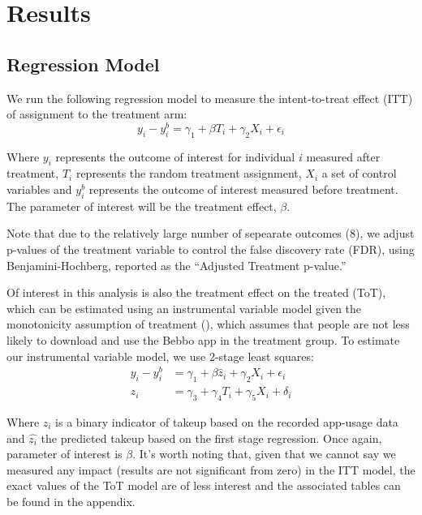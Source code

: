 \documentclass{article}
\begin{document}





\section{Results}

\subsection*{Regression Model}

We run the following regression model to measure the intent-to-treat effect (ITT) of assignment to the treatment arm:
$$
y_{i} - y^{b}_i = \gamma_1 + \beta T_{i} + \gamma_2X_{i} + \epsilon_i
$$

Where $y_i$ represents the outcome of interest for individual $i$ measured after treatment, $T_i$ represents the random treatment assignment, $X_i$ a set of control variables and $y^b_i$ represents the outcome of interest measured before treatment. The parameter of interest will be the treatment effect, $\beta$.

Note that due to the relatively large number of sepearate outcomes (8), we adjust p-values of the treatment variable to control the false discovery rate (FDR), using Benjamini-Hochberg, reported as the ``Adjusted Treatment p-value.''

Of interest in this analysis is also the treatment effect on the treated (ToT), which can be estimated using an instrumental variable model given the monotonicity assumption of treatment (\cite{Imbens2015}), which assumes that people are not less likely to download and use the Bebbo app in the treatment group. To estimate our instrumental variable model, we use 2-stage least squares:
\begin{align*}
y_{i} - y^{b}_i &= \gamma_1 + \beta \hat{z}_{i} + \gamma_2X_{i} + \epsilon_i \\
z_{i} &= \gamma_3 + \gamma_4 T_{i} + \gamma_5X_{i} + \delta_i
\end{align*}

Where $z_i$ is a binary indicator of takeup based on the recorded app-usage data and $\hat{z_i}$ the predicted takeup based on the first stage regression. Once again, parameter of interest is $\beta$. It's worth noting that, given that we cannot say we measured any impact (results are not significant from zero) in the ITT model, the exact values of the ToT model are of less interest and the associated tables can be found in the appendix.
\end{document}
